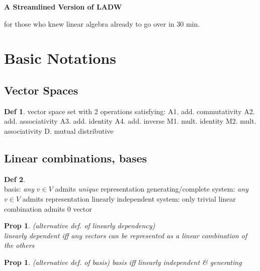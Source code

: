 \documentclass[hidelinks]{article}
\theoremstyle{definition}
\newtheorem*{defin}{Def}
\theoremstyle{plain}
\newtheorem{proposition}[theorem]{Prop}
\theoremstyle{remark}
\begin{document}
\begin{center}
\LARGE\textbf{A Streamlined Version of LADW}
\end{center}

\begin{center}
 \large{for those who knew linear algebra already to go over in 30 min.}
\end{center}



\section{Basic Notations}

\subsection{Vector Spaces}
\begin{defin}vector space\newline
set with 2 operations satisfying: \newline
\indent A1. add. commutativity
\indent A2. add. associativity
\indent A3. add. identity
\indent A4. add. inverse \newline
\indent M1. mult. identity
\indent M2. mult. associativity \newline
\indent D. mutual distributive
\end{defin}

\subsection{Linear combinations, bases}
\begin{defin}~\\
basis: \emph{any} $v\in V$ admits \emph{unique} representation \newline
generating/complete system: \emph{any} $v\in V$ admits representation \newline
linearly independent system: only trivial linear combination admits 0 vector
\end{defin}

\begin{proposition} (alternative def. of linearly dependency)~\\
linearly dependent iff any vectors can be represented as a linear combination of the others
\end{proposition}

\begin{proposition} (alternative def. of basis) basis iff linearly independent \& generating
\end{proposition}
\end{document}
